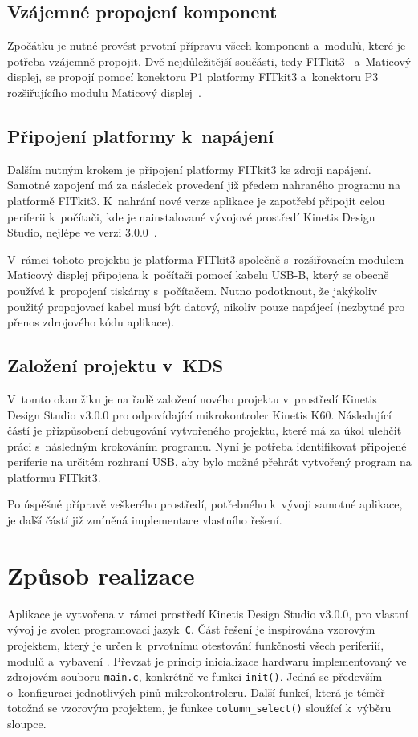 \documentclass[a4paper, 11pt]{article}
\begin{document}
\subsection{Vzájemné propojení komponent}
    Zpočátku je nutné provést prvotní přípravu všech komponent a~modulů, které je potřeba vzájemně propojit.
    Dvě nejdůležitější součásti, tedy FITkit3~\cite{fitkit3} a~Maticový displej, se propojí pomocí konektoru P1 platformy FITkit3 a~konektoru P3 rozšiřujícího modulu Maticový displej~\cite{zadani}.

\subsection{Připojení platformy k~napájení}
    Dalším nutným krokem je připojení platformy FITkit3 ke zdroji napájení.
    Samotné zapojení má za následek provedení již předem nahraného programu na platformě FITkit3.
    K~nahrání nové verze aplikace je zapotřebí připojit celou periferii k~počítači, kde je nainstalované vývojové prostředí Kinetis Design Studio, nejlépe ve verzi 3.0.0~\cite{kds}.

    V~rámci tohoto projektu je platforma FITkit3 společně s~rozšiřovacím modulem Maticový displej připojena k~počítači pomocí kabelu USB-B, který se obecně používá k~propojení tiskárny s~počítačem.
    Nutno podotknout, že jakýkoliv použitý propojovací kabel musí být datový, nikoliv pouze napájecí (nezbytné pro přenos zdrojového kódu aplikace).

\subsection{Založení projektu v~KDS}
    V~tomto okamžiku je na řadě založení nového projektu v~prostředí Kinetis Design Studio v3.0.0 pro odpovídající mikrokontroler Kinetis K60.
    Následující částí je přizpůsobení debugování vytvořeného projektu, které má za úkol ulehčit práci s~následným krokováním programu.
    Nyní je potřeba identifikovat připojené periferie na určitém rozhraní USB, aby bylo možné přehrát vytvořený program na platformu FITkit3.
    
    Po úspěšné přípravě veškerého prostředí, potřebného k~vývoji samotné aplikace, je další částí již zmíněná implementace vlastního řešení.

\newpage

\section{Způsob realizace}
    Aplikace je vytvořena v~rámci prostředí Kinetis Design Studio v3.0.0, pro vlastní vývoj je zvolen programovací jazyk~\texttt{C}.
    Část řešení je inspirována vzorovým projektem, který je určen k~prvotnímu otestování funkčnosti všech periferiií, modulů a~vybavení \cite{vzor}.
    Převzat je princip inicializace hardwaru implementovaný ve zdrojovém souboru \texttt{main.c}, konkrétně ve funkci \texttt{init()}.
    Jedná se především o~konfiguraci jednotlivých pinů mikrokontroleru.
    Další funkcí, která je téměř totožná se vzorovým projektem, je funkce \texttt{column\_select()} sloužící k~výběru sloupce.
\end{document}
